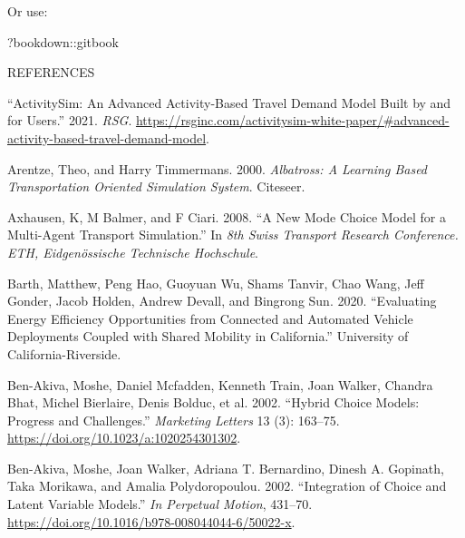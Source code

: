 \documentclass[12pt, oneside, openright]{byuthesis}
\newlength{\cslhangindent}
\newlength{\cslentryspacingunit} %
\newenvironment{CSLReferences}[2] %
 {%
  \setlength{\parindent}{0pt}
  \ifodd #1
  \let\oldpar\par
  \def\par{\hangindent=\cslhangindent\oldpar}
  \fi
  \setlength{\parskip}{#2\cslentryspacingunit}
 }%
 {}
\newenvironment{Shaded}{\begin{snugshade}}{\end{snugshade}}
\newcommand{\NormalTok}[1]{#1}
\newcommand{\SpecialCharTok}[1]{\textcolor[rgb]{0.00,0.00,0.00}{#1}}
\begin{document}
Or use:

\begin{Shaded}
\begin{Highlighting}[]
\NormalTok{?bookdown}\SpecialCharTok{::}\NormalTok{gitbook}
\end{Highlighting}
\end{Shaded}

\cleardoublepage
    \begin{centering}
    REFERENCES\\
     \baselineskip
    \end{centering}

\hypertarget{refs}{}
\begin{CSLReferences}{1}{0}
\leavevmode{}%
{``ActivitySim: An Advanced Activity-Based Travel Demand Model Built by and for Users.''} 2021. \emph{RSG}. \url{https://rsginc.com/activitysim-white-paper/\#advanced-activity-based-travel-demand-model}.

\leavevmode{}%
Arentze, Theo, and Harry Timmermans. 2000. \emph{Albatross: A Learning Based Transportation Oriented Simulation System}. Citeseer.

\leavevmode{}%
Axhausen, K, M Balmer, and F Ciari. 2008. {``A New Mode Choice Model for a Multi-Agent Transport Simulation.''} In \emph{8th Swiss Transport Research Conference. ETH, Eidgen{ö}ssische Technische Hochschule}.

\leavevmode{}%
Barth, Matthew, Peng Hao, Guoyuan Wu, Shams Tanvir, Chao Wang, Jeff Gonder, Jacob Holden, Andrew Devall, and Bingrong Sun. 2020. {``Evaluating Energy Efficiency Opportunities from Connected and Automated Vehicle Deployments Coupled with Shared Mobility in California.''} University of California-Riverside.

\leavevmode{}%
Ben-Akiva, Moshe, Daniel Mcfadden, Kenneth Train, Joan Walker, Chandra Bhat, Michel Bierlaire, Denis Bolduc, et al. 2002. {``Hybrid Choice Models: Progress and Challenges.''} \emph{Marketing Letters} 13 (3): 163--75. \url{https://doi.org/10.1023/a:1020254301302}.

\leavevmode{}%
Ben-Akiva, Moshe, Joan Walker, Adriana T. Bernardino, Dinesh A. Gopinath, Taka Morikawa, and Amalia Polydoropoulou. 2002. {``Integration of Choice and Latent Variable Models.''} \emph{In Perpetual Motion}, 431--70. \url{https://doi.org/10.1016/b978-008044044-6/50022-x}.


\end{CSLReferences}
\end{document}
